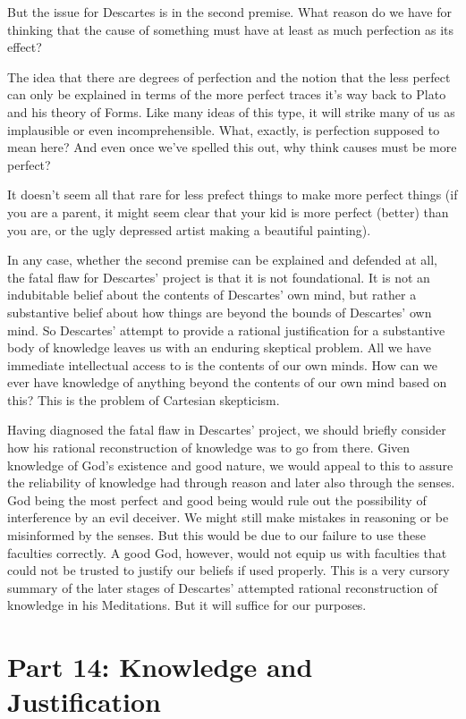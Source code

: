 But the issue for Descartes is in the second premise. What reason do we have for thinking that the cause of something must have at least as much perfection as its effect?

The idea that there are degrees of perfection and the notion that the less perfect can only be explained in terms of the more perfect traces it's way back to Plato and his theory of Forms. Like many ideas of this type, it will strike many of us as implausible or even incomprehensible. What, exactly, is perfection supposed to mean here?  And even once we’ve spelled this out, why think causes must be more perfect?

It doesn't seem all that rare for less prefect things to make more perfect things (if you are a parent, it might seem clear that your kid is more perfect (better) than you are, or the ugly depressed artist making a beautiful painting).

In any case, whether the second premise can be explained and defended at all, the fatal flaw for Descartes’ project is that it is not foundational. It is not an indubitable belief about the contents of Descartes’ own mind, but rather a substantive belief about how things are beyond the bounds of Descartes’ own mind. So Descartes’ attempt to provide a rational justification for a substantive body of knowledge leaves us with an enduring skeptical problem. All we have immediate intellectual access to is the contents of our own minds. How can we ever have knowledge of anything beyond the contents of our own mind based on this? This is the problem of Cartesian skepticism.

Having diagnosed the fatal flaw in Descartes’ project, we should briefly consider how his rational reconstruction of knowledge was to go from there. Given knowledge of God’s existence and good nature, we would appeal to this to assure the reliability of knowledge had through reason and later also through the senses. God being the most perfect and good being would rule out the possibility of interference by an evil deceiver. We might still make mistakes in reasoning or be misinformed by the senses. But this would be due to our failure to use these faculties correctly. A good God, however, would not equip us with faculties that could not be trusted to justify our beliefs if used properly. This is a very cursory summary of the later stages of Descartes’ attempted rational reconstruction of knowledge in his Meditations. But it will suffice for our purposes.

\chapter{Part 14: Knowledge and Justification}

